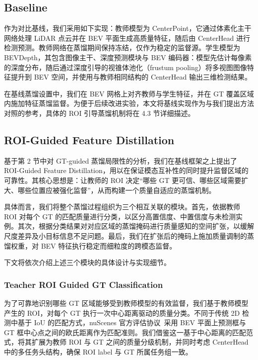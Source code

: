 \documentclass[12pt, UTF8]{ctexart}
\begin{document}
\subsection{Baseline}
作为对比基线，我们采用如下实现：教师模型为 CenterPoint，它通过体素化主干网络处理 LiDAR 点云并在 BEV 平面生成高质量特征，随后由 CenterHead 进行检测预测。教师网络在蒸馏期间保持冻结，仅作为稳定的监督源。学生模型为 BEVDepth，其包含图像主干、深度预测模块与 BEV 编码器：模型先估计每像素的深度分布，随后通过深度引导的视锥体池化（frustum pooling）将多视图图像特征提升到 BEV 空间，并使用与教师相同结构的 CenterHead 输出三维检测结果。

在基线蒸馏设置中，我们在 BEV 网格上对齐教师与学生特征，并在 GT 覆盖区域内施加特征蒸馏监督。为便于后续改进实验，本文将基线实现作为与我们提出方法对照的参考，具体的 ROI 引导蒸馏机制将在 4.3 节详细描述。



\subsection{ROI-Guided Feature Distillation}

基于第 2 节中对 GT-guided 蒸馏局限性的分析，我们在基线框架之上提出了 ROI-Guided Feature Distillation，用以在保证模态互补性的同时提升监督区域的可靠性。其核心思想是：让教师的 ROI 决定“哪些 GT 更可信、哪些区域需要扩大、哪些位置应被强化监督”，从而构建一个质量自适应的蒸馏机制。

具体而言，我们将整个蒸馏过程组织为三个相互关联的模块。首先，依据教师 ROI 对每个 GT 的匹配质量进行分类，以区分高置信度、中置信度与未检测实例。其次，根据分类结果对对应区域的蒸馏掩码进行质量感知的空间扩张，以缓解尺度差异及小目标信息不足问题。最后，我们在扩张后的掩码上施加质量调制的蒸馏权重，对 BEV 特征执行稳定而细粒度的跨模态监督。

下文将依次介绍上述三个模块的具体设计与实现细节。


\subsubsection{Teacher ROI Guided GT Classification}
为了可靠地识别哪些 GT 区域能够受到教师模型的有效监督，我们基于教师模型产生的 ROI，对每个 GT 执行一次中心距离驱动的质量分类。不同于传统 2D 检测中基于 IoU 的匹配方式，nuScenes 官方评估协议~\cite{nuscenes}采用 BEV 平面上预测框与 GT 框中心点之间的欧氏距离作为匹配准则。我们借鉴这一基于中心距离的匹配范式，将其扩展为教师 ROI 与 GT 之间的质量分级机制，并同时考虑 CenterHead 中的多任务头结构，确保 ROI label 与 GT 所属任务组一致。
\end{document}
